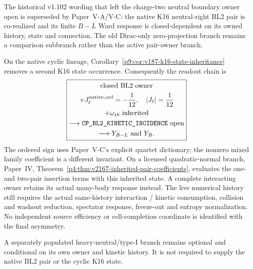 \documentclass[12pt,a4paper]{article}
\begin{document}
\begin{corollary}
\label{p9:cor:v1109-current-baryogenesis-readout}
The historical v1.102 wording that left the charge-two neutral boundary owner
open is superseded by Paper~V-A/V-C: the native K16 neutral-right BL2 pair is
co-realized and its finite $B-L$ Ward response is closed-dependent on its
owned history, state and connection.  The old Dirac-only zero-projection
branch remains a comparison subbranch rather than the active pair-owner
branch.

On the native cyclic lineage, Corollary~\ref{p9:cor:v187-k16-state-inheritance}
removes a second K16 state occurrence.  Consequently the readout chain is
\[
 \boxed{\begin{gathered}
 \text{closed BL2 owner}\\
 +J_\ell^{\rm native,ord}=-\frac1{12},\quad |J_\ell|=\frac1{12}\\
 +\omega_{16}\ \text{inherited}\\
 \longrightarrow\texttt{CP\_BL2\_KINETIC\_INCIDENCE}\ \text{open}\\
 \longrightarrow Y_{B-L}\ \text{and }Y_B.
 \end{gathered}}
\]
The ordered sign uses Paper~V-C's explicit quartet dictionary; the
nonzero mixed family coefficient is a different invariant. On a licensed
quadratic-normal branch, Paper~IV,
Theorem~\ref{p4:thm:v2167-inherited-pair-coefficients}, evaluates the
one- and two-pair insertion terms with this inherited state. A complete
interacting owner retains its actual many-body response instead.
The live numerical history still requires the actual same-history interaction /
kinetic consumption, collision and washout reduction, spectator response,
freeze-out and entropy normalization.  No independent source efficiency or
cell-completion coordinate is identified with the final asymmetry.
\end{corollary}

\begin{remark}
\label{p9:rem:v1109-heavy-neutral-branch}
A separately populated heavy-neutral/type-I branch remains optional and
conditional on its own owner and kinetic history.  It is not required to
supply the native BL2 pair or the cyclic K16 state.
\end{remark}



\end{document}
